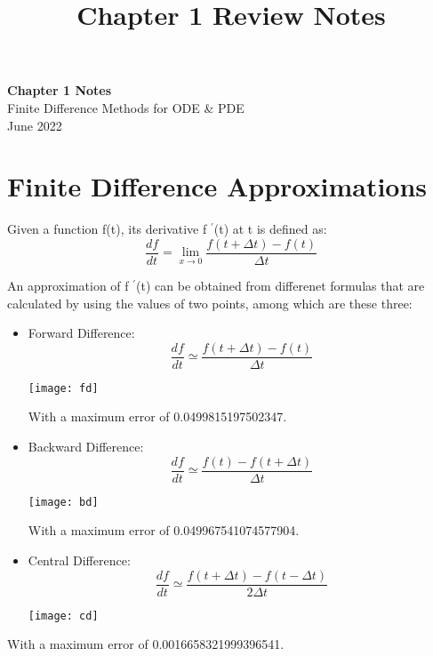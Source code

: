 \documentclass[11pt]{article}
\theoremstyle{definition}
\begin{document}
\setcounter{section}{0}
\title{Chapter 1 Review Notes}

\thispagestyle{empty}

\begin{center}
{\LARGE \bf Chapter 1 Notes}\\

{\large Finite Difference Methods for ODE \& PDE}\\
June 2022
\end{center}

\section{Finite Difference Approximations}

Given a function f(t), its derivative f $^\prime$(t) at t is defined as:
\begin{equation}
 \label{exactd}
 \frac{df}{dt} = \lim_{x \to 0} \frac{f(t + \Delta t)-f(t)}{\Delta t}
\end{equation}

An approximation of f $^\prime$(t) can be obtained from differenet formulas that are  calculated by using the values of two points, among which are these three:
\begin{itemize}
 \item Forward Difference:
 \begin{equation}
  \frac{df}{dt} \simeq  \frac{f(t+\Delta t)-f(t)}{\Delta t}
 \end{equation}
\begin{center} \texttt{[image: fd]} 
\end{center}
With a maximum error of 0.0499815197502347.

 \item Backward Difference:
 \begin{equation}
  \frac{df}{dt} \simeq  \frac{f(t)-f(t + \Delta t)}{\Delta t}
 \end{equation}
  \begin{center} \texttt{[image: bd]}
  \end{center}
 With a maximum error of 0.049967541074577904.
  
 \item Central Difference:
 \begin{equation}
  \frac{df}{dt} \simeq  \frac{f(t+ \Delta t)-f(t - \Delta t)}{2\Delta t}
 \end{equation}
   \begin{center} \texttt{[image: cd]}
   \end{center}
\end{itemize}
With a maximum error of 0.0016658321999396541.\\
\end{document}
